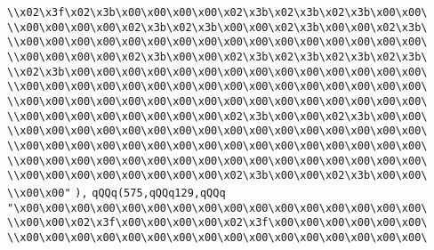 \verb|\\x02\x3f\x02\x3b\x00\x00\x00\x00\x02\x3b\x02\x3b\x02\x3b\x00\x00\|\newline
\verb|\\x00\x00\x00\x00\x02\x3b\x02\x3b\x00\x00\x02\x3b\x00\x00\x02\x3b\|\newline
\verb|\\x00\x00\x00\x00\x00\x00\x00\x00\x00\x00\x00\x00\x00\x00\x00\x00\|\newline
\verb|\\x00\x00\x00\x00\x02\x3b\x00\x00\x02\x3b\x02\x3b\x02\x3b\x02\x3b\|\newline
\verb|\\x02\x3b\x00\x00\x00\x00\x00\x00\x00\x00\x00\x00\x00\x00\x00\x00\|\newline
\verb|\\x00\x00\x00\x00\x00\x00\x00\x00\x00\x00\x00\x00\x00\x00\x00\x00\|\newline
\verb|\\x00\x00\x00\x00\x00\x00\x00\x00\x00\x00\x00\x00\x00\x00\x00\x00\|\newline
\verb|\\x00\x00\x00\x00\x00\x00\x00\x00\x02\x3b\x00\x00\x02\x3b\x00\x00\|\newline
\verb|\\x00\x00\x00\x00\x00\x00\x00\x00\x00\x00\x00\x00\x00\x00\x00\x00\|\newline
\verb|\\x00\x00\x00\x00\x00\x00\x00\x00\x00\x00\x00\x00\x00\x00\x00\x00\|\newline
\verb|\\x00\x00\x00\x00\x00\x00\x00\x00\x00\x00\x00\x00\x00\x00\x00\x00\|\newline
\verb|\\x00\x00\x00\x00\x00\x00\x00\x00\x02\x3b\x00\x00\x02\x3b\x00\x00\|\newline
\verb|\\x00\x00"|\newline
\verb|),|\newline
\verb|qQQq(575,qQQq129,qQQq|\newline
\verb|"\x00\x00\x00\x00\x00\x00\x00\x00\x00\x00\x00\x00\x00\x00\x00\x00\|\newline
\verb|\\x00\x00\x02\x3f\x00\x00\x00\x00\x02\x3f\x00\x00\x00\x00\x00\x00\|\newline
\verb|\\x00\x00\x00\x00\x00\x00\x00\x00\x00\x00\x00\x00\x00\x00\x00\x00\|\newline
